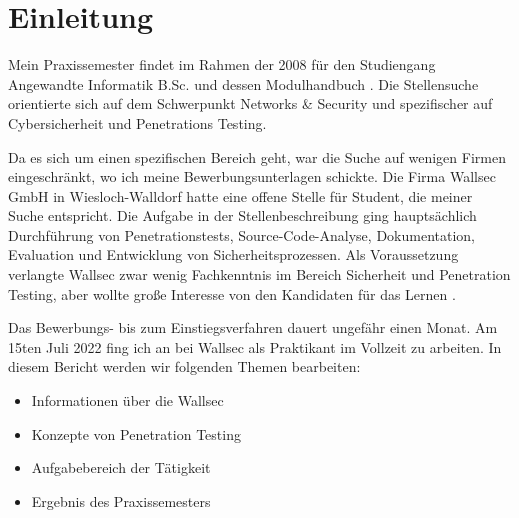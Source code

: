 \section{Einleitung}


Mein Praxissemester findet im Rahmen der  2008 für den Studiengang Angewandte Informatik B.Sc. und dessen Modulhandbuch \cite{Hochschule_Worms_FPO}. Die Stellensuche orientierte sich auf dem Schwerpunkt Networks \& Security und spezifischer auf Cybersicherheit und Penetrations Testing. 

Da es sich um einen spezifischen Bereich geht, war die Suche auf wenigen Firmen eingeschränkt, wo ich meine Bewerbungsunterlagen schickte. Die Firma Wallsec GmbH in Wiesloch-Walldorf hatte eine offene Stelle für Student, die meiner Suche entspricht. Die Aufgabe in der Stellenbeschreibung ging hauptsächlich Durchführung von Penetrationstests, Source-Code-Analyse, Dokumentation, Evaluation und Entwicklung von Sicherheitsprozessen. Als Voraussetzung verlangte Wallsec zwar wenig Fachkenntnis im Bereich Sicherheit und Penetration Testing, aber wollte große Interesse von den Kandidaten für das Lernen \cite{Wallsec}.

Das Bewerbungs- bis zum Einstiegsverfahren dauert ungefähr einen Monat. Am 15ten Juli 2022 fing ich an bei Wallsec als Praktikant im Vollzeit zu arbeiten. In diesem Bericht werden wir folgenden Themen bearbeiten:

\begin{itemize}
   \item Informationen über die Wallsec
   \item Konzepte von Penetration Testing
   \item Aufgabebereich der Tätigkeit
   \item Ergebnis des Praxissemesters
\end{itemize}

